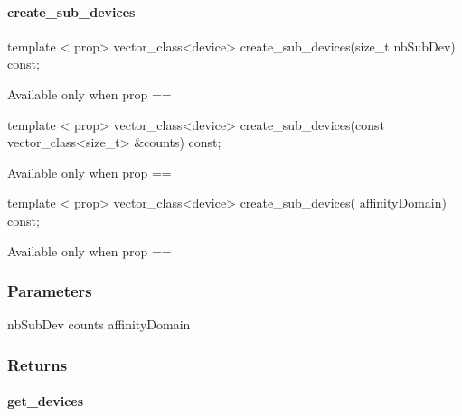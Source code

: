 \documentclass[letterpaper,10pt,english]{sphinxmanual}
\begin{document}
\paragraph{create\_sub\_devices}
\label{\detokenize{programming-interface/runtime/device:create-sub-devices}}\begin{sphinxalltt}
template \textless{} prop\textgreater{}
vector\_class\textless{}device\textgreater{} create\_sub\_devices(size\_t nbSubDev) const; \begin{footnote}[7]\sphinxAtStartFootnote
Available only when prop == 
\end{footnote}
\end{sphinxalltt}
\begin{sphinxalltt}
template \textless{} prop\textgreater{}
vector\_class\textless{}device\textgreater{} create\_sub\_devices(const vector\_class\textless{}size\_t\textgreater{} \&counts) const; \begin{footnote}[8]\sphinxAtStartFootnote
Available only when prop == 
\end{footnote}
\end{sphinxalltt}
\begin{sphinxalltt}
template \textless{} prop\textgreater{}
vector\_class\textless{}device\textgreater{} create\_sub\_devices( affinityDomain) const; \begin{footnote}[9]\sphinxAtStartFootnote
Available only when prop == 
\end{footnote}
\end{sphinxalltt}
\subsubsection*{Parameters}

nbSubDev \sphinxhyphen{}
counts \sphinxhyphen{}
affinityDomain \sphinxhyphen{}
\subsubsection*{Returns}


\paragraph{get\_devices}
\label{\detokenize{programming-interface/runtime/device:get-devices}}
\begin{sphinxVerbatim}[commandchars=\\\{\}]
  
       
\end{sphinxVerbatim}
\end{document}
